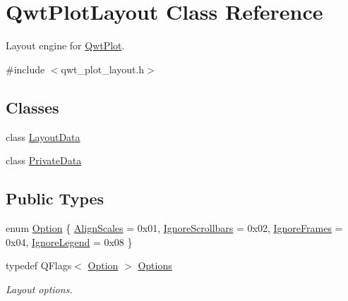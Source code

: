 \hypertarget{class_qwt_plot_layout}{\section{Qwt\-Plot\-Layout Class Reference}
\label{class_qwt_plot_layout}
}


Layout engine for \hyperlink{class_qwt_plot}{Qwt\-Plot}.  




{\ttfamily \#include $<$qwt\-\_\-plot\-\_\-layout.\-h$>$}

\subsection*{Classes}
\begin{DoxyCompactItemize}
\item 
class \hyperlink{class_qwt_plot_layout_1_1_layout_data}{Layout\-Data}
\item 
class \hyperlink{class_qwt_plot_layout_1_1_private_data}{Private\-Data}
\end{DoxyCompactItemize}
\subsection*{Public Types}
\begin{DoxyCompactItemize}
\item 
enum \hyperlink{class_qwt_plot_layout_ad0d2d60e86a4c69ec105524041d5221d}{Option} \{ \hyperlink{class_qwt_plot_layout_ad0d2d60e86a4c69ec105524041d5221daf92cc90a2b68a8788a813807d379b95a}{Align\-Scales} = 0x01, 
\hyperlink{class_qwt_plot_layout_ad0d2d60e86a4c69ec105524041d5221da813736a8e614f8f24db773081642b74c}{Ignore\-Scrollbars} = 0x02, 
\hyperlink{class_qwt_plot_layout_ad0d2d60e86a4c69ec105524041d5221da9036bf7de40018a2f12d456a04949c6b}{Ignore\-Frames} = 0x04, 
\hyperlink{class_qwt_plot_layout_ad0d2d60e86a4c69ec105524041d5221daa7237e2be1e8fc41a8b3156b57b95ed3}{Ignore\-Legend} = 0x08
 \}
\item 
typedef Q\-Flags$<$ \hyperlink{class_qwt_plot_layout_ad0d2d60e86a4c69ec105524041d5221d}{Option} $>$ \hyperlink{class_qwt_plot_layout_aa43457184903f3aaa58e6e073622ef52}{Options}
\begin{DoxyCompactList}\small\item\em Layout options. \end{DoxyCompactList}\end{DoxyCompactItemize}
